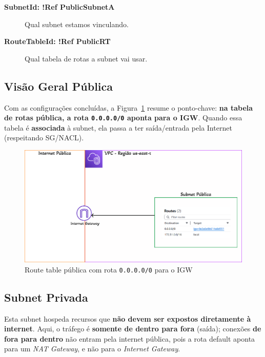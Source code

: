 \begin{description}
  \item[\textbf{SubnetId: !Ref PublicSubnetA}] Qual subnet estamos vinculando.
  \item[\textbf{RouteTableId: !Ref PublicRT}] Qual tabela de rotas a subnet vai usar.
\end{description}

\subsection{Visão Geral Pública}
Com as configurações concluídas, a Figura~\ref{fig:rt-publica} resume o ponto-chave: 
\textbf{na tabela de rotas pública, a rota \texttt{0.0.0.0/0} aponta para o IGW}. 
Quando essa tabela é \textbf{associada} à subnet, ela passa a ter saída/entrada pela Internet (respeitando SG/NACL).

\begin{figure}[H]
\centering
\caption{Route table pública com rota \texttt{0.0.0.0/0} para o IGW}
\label{fig:rt-publica}
\includegraphics[scale=0.5]{imagens/SubnetPublica.png}
\end{figure}


\subsection{Subnet Privada}
Esta subnet hospeda recursos que \textbf{não devem ser expostos diretamente à internet}. Aqui, o tráfego é \textbf{somente de dentro para fora} (saída); conexões \textbf{de fora para dentro} não entram pela internet pública, pois a rota default aponta para um \textit{NAT Gateway}, e não para o \textit{Internet Gateway}.

